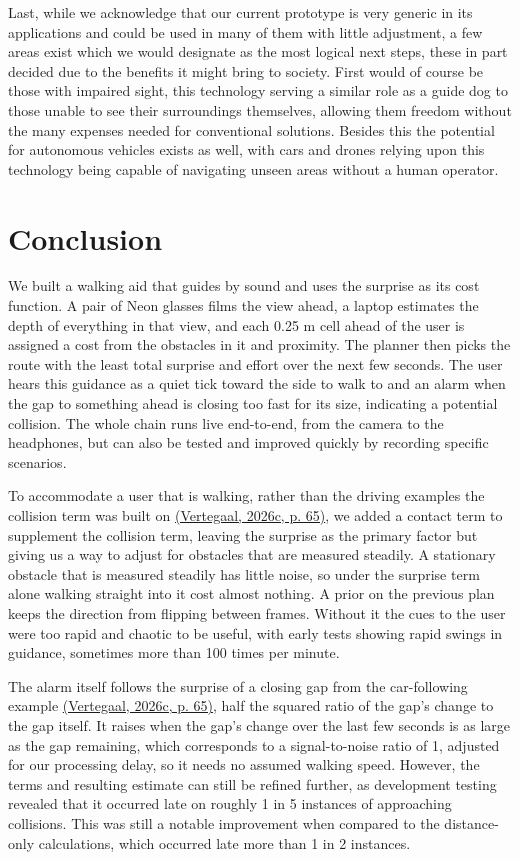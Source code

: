 \documentclass[a4paper]{article}
\begin{document}
Last, while we acknowledge that our current prototype is very generic in its applications and could be used in many of them with little adjustment, a few areas exist which we would designate as the most logical next steps, these in part decided due to the benefits it might bring to society. First would of course be those with impaired sight, this technology serving a similar role as a guide dog to those unable to see their surroundings themselves, allowing them freedom without the many expenses needed for conventional solutions. Besides this the potential for autonomous vehicles exists as well, with cars and drones relying upon this technology being capable of navigating unseen areas without a human operator.

\section{Conclusion} \label{conclusion}

We built a walking aid that guides by sound and uses the surprise as its cost function. A pair of Neon glasses films the view ahead, a laptop estimates the depth of everything in that view, and each 0.25 m cell ahead of the user is assigned a cost from the obstacles in it and proximity. The planner then picks the route with the least total surprise and effort over the next few seconds. The user hears this guidance as a quiet tick toward the side to walk to and an alarm when the gap to something ahead is closing too fast for its size, indicating a potential collision. The whole chain runs live end-to-end, from the camera to the headphones, but can also be tested and improved quickly by recording specific scenarios.

To accommodate a user that is walking, rather than the driving examples the collision term was built on \hyperref[references]{(Vertegaal, 2026c, p. 65)}, we added a contact term to supplement the collision term, leaving the surprise as the primary factor but giving us a way to adjust for obstacles that are measured steadily. A stationary obstacle that is measured steadily has little noise, so under the surprise term alone walking straight into it cost almost nothing. A prior on the previous plan keeps the direction from flipping between frames. Without it the cues to the user were too rapid and chaotic to be useful, with early tests showing rapid swings in guidance, sometimes more than 100 times per minute. 

The alarm itself follows the surprise of a closing gap from the car-following example \hyperref[references]{(Vertegaal, 2026c, p. 65)}, half the squared ratio of the gap's change to the gap itself. It raises when the gap's change over the last few seconds is as large as the gap remaining, which corresponds to a signal-to-noise ratio of 1, adjusted for our processing delay, so it needs no assumed walking speed. However, the terms and resulting estimate can still be refined further, as development testing revealed that it occurred late on roughly 1 in 5 instances of approaching collisions. This was still a notable improvement when compared to the distance-only calculations, which occurred late more than 1 in 2 instances.
\end{document}
